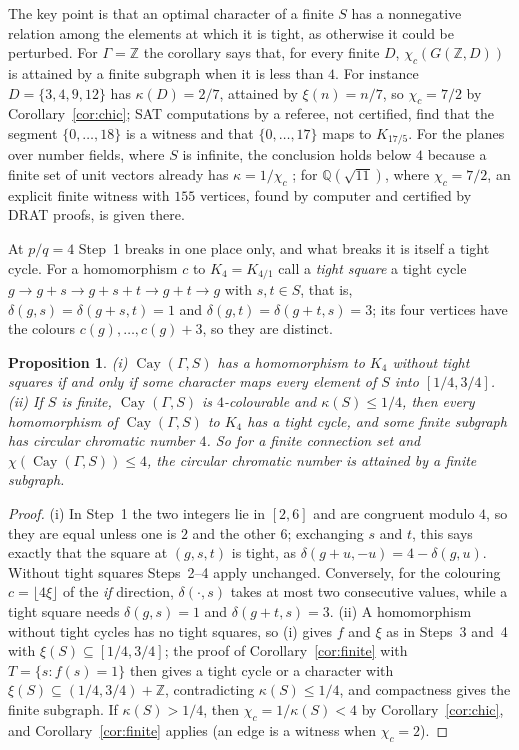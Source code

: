 \documentclass[11pt,a4paper]{amsart}
\newtheorem{proposition}[theorem]{Proposition}
\theoremstyle{definition}
\newcommand{\Q}{\mathbb{Q}}
\newcommand{\Z}{\mathbb{Z}}
\newcommand{\Cay}{\operatorname{Cay}}
\begin{document}
The key point is that an optimal character of a finite $S$ has a nonnegative relation among the elements at which it
is tight, as otherwise it could be perturbed. For $\Gamma=\Z$ the corollary says that, for every finite $D$,
$\chi_c(G(\Z,D))$ is attained by a finite subgraph when it is less than $4$. For instance $D=\{3,4,9,12\}$ has
$\kappa(D)=2/7$, attained by $\xi(n)=n/7$, so $\chi_c=7/2$ by Corollary~\ref{cor:chic}; SAT computations by a
referee, not certified, find that the segment $\{0,\dots,18\}$ is a witness and that $\{0,\dots,17\}$ maps to
$K_{17/5}$. For
the planes over number fields, where $S$ is infinite, the conclusion holds below $4$ because a finite set of unit
vectors already has $\kappa=1/\chi_c$ \cite[Corollary~7]{TCol}; for $\Q(\sqrt{11})$, where $\chi_c=7/2$, an
explicit finite witness with $155$ vertices, found by computer and certified by DRAT proofs, is given there.

At $p/q=4$ Step~1 breaks in one place only, and what breaks it is itself a tight cycle. For a homomorphism $c$ to
$K_4=K_{4/1}$ call a \emph{tight square} a tight cycle $g\to g+s\to g+s+t\to g+t\to g$ with $s,t\in S$, that is,
$\delta(g,s)=\delta(g+s,t)=1$ and $\delta(g,t)=\delta(g+t,s)=3$; its four vertices have the colours $c(g),\dots,
c(g)+3$, so they are distinct.

\begin{proposition}\label{prop:four}
\textup{(i)} $\Cay(\Gamma,S)$ has a homomorphism to $K_4$ without tight squares if and only if some character maps
every element of $S$ into $[1/4,3/4]$.
\textup{(ii)} If $S$ is finite, $\Cay(\Gamma,S)$ is $4$-colourable and $\kappa(S)\le1/4$, then every homomorphism of
$\Cay(\Gamma,S)$ to $K_4$ has a tight cycle, and some finite subgraph has circular chromatic number $4$. So for a
finite connection set and $\chi(\Cay(\Gamma,S))\le4$, the circular chromatic number is attained by a finite subgraph.
\end{proposition}

\begin{proof}
(i) In Step~1 the two integers lie in $[2,6]$ and are congruent modulo $4$, so they are equal unless one is $2$ and
the other $6$; exchanging $s$ and $t$, this says exactly that the square at $(g,s,t)$ is tight, as
$\delta(g+u,-u)=4-\delta(g,u)$. Without tight squares Steps~2--4 apply unchanged. Conversely, for the colouring
$c=\lfloor4\xi\rfloor$ of the \emph{if} direction, $\delta(\cdot,s)$ takes at most two consecutive values, while a tight
square needs $\delta(g,s)=1$ and $\delta(g+t,s)=3$. (ii) A homomorphism without tight cycles has no tight squares, so
(i) gives $f$ and $\xi$ as in Steps~3 and~4 with $\xi(S)\subseteq[1/4,3/4]$; the proof of
Corollary~\ref{cor:finite} with $T=\{s:f(s)=1\}$ then gives a tight cycle or a character with
$\xi(S)\subseteq(1/4,3/4)+\Z$, contradicting $\kappa(S)\le1/4$, and compactness gives the finite subgraph. If
$\kappa(S)>1/4$, then $\chi_c=1/\kappa(S)<4$ by Corollary~\ref{cor:chic}, and Corollary~\ref{cor:finite} applies (an
edge is a witness when $\chi_c=2$).
\end{proof}
\end{document}
